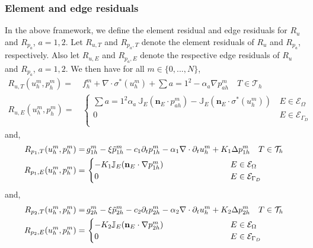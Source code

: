 \subsubsection{Element and edge residuals}
In the above framework, we define the element residual and edge residuals for $R_u$ and $R_{p_a}$, $a=1,2$. Let $R_{u,T}$ and $R_{p_a,T}$ denote the element residuals of $R_u$ and $R_{p_a}$, respectively. Also let $R_{u,E}$ and $R_{p_a,E}$ denote the respective edge residuals of $R_u$ and $R_{p_a}$, $a=1,2$. We then have for all $m\in\{0,...,N\}$,
\begin{align} \label{bb_u_element_edge_res}
R_{u,T}(u^m_h,p^m_h) = & \, f_h^m + \nabla \cdot \sigma^{\ast}(u_h^m) + \sum{a=1}^2 -\alpha_a \nabla p_{ah}^m  \quad  T \in \mathcal{T}_h\\ 
R_{u,E}(u^m_h,p^m_h)  = & \, \begin{cases} 
	\sum{a=1}^2 \alpha_a \, \mathbb{J}_E(\mathbf{n}_E \cdot p_{ah}^m) - \mathbb{J}_E(\mathbf{n}_E \cdot \sigma^{\ast}(u_h^m)) & \,  E \in \mathcal{E}_\Omega \\
     0 & \, E \in \mathcal{E}_{\Gamma_D} \\
\end{cases}
\end{align} 
and,
\begin{align} \label{bb_p_element_edge_res}
R_{p_1,T}(u^m_h,p^m_h)  = & \, g^m_{1h}  - \xi\tilde{p}_{1h}^m - c_1\partial_t p^m_{1h} - \alpha_1 \nabla \cdot \partial_t u_h^m + K_1 \Delta p_{1h}^m \quad  T \in \mathcal{T}_h\\ 
R_{p_1,E}(u^m_h,p^m_h)  = & \, \begin{cases} 
	- K_1 \mathbb{J}_E(\mathbf{n}_E \cdot \nabla p_{1h}^m)  & \hspace{2.5cm} E \in \mathcal{E}_\Omega \\
     0 & \hspace{2.5cm} E \in \mathcal{E}_{\Gamma_D} \\
\end{cases}
\end{align}
and,
\begin{align} \label{bb_p_element_edge_res}
R_{p_2,T}(u^m_h,p^m_h)  = & \, g^m_{2h}  - \xi\tilde{p}_{2h}^m - c_2\partial_t p^m_{2h} - \alpha_2 \nabla \cdot \partial_t u_h^m + K_2 \Delta p_{2h}^m \quad  T \in \mathcal{T}_h\\ 
R_{p_2,E}(u^m_h,p^m_h)  = & \, \begin{cases} 
	- K_2 \mathbb{J}_E(\mathbf{n}_E \cdot \nabla p_{2h}^m)  & \hspace{2.5cm}  E \in \mathcal{E}_\Omega \\
     0 & \hspace{2.5cm} E \in \mathcal{E}_{\Gamma_D} \\
\end{cases}
\end{align}
